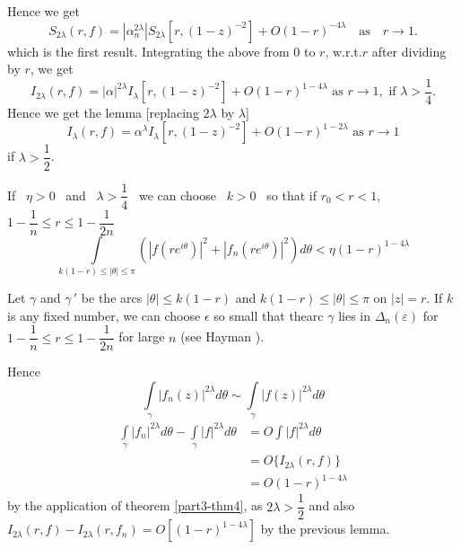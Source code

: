 Hence we get
$$
S_{2\lambda}(r,f)=|\alpha^{2\lambda}_{n}|S_{2\lambda}[r,(1-z)^{-2}] +
O(1-r)^{-4\lambda}\quad\text{as}\quad 
r\to 1.
$$
which is the first result. Integrating the above from $0$ to $r$,
w.r.t.\@ $r$ after dividing by $r$, we get
$$
I_{2\lambda}(r,f)=|\alpha|^{2\lambda}I_{\lambda}[r,(1-z)^{-2}] +
O(1-r)^{1-4\lambda}\text{   \  as \ } r\to 1, \text{ \  if \ }
\lambda>\frac{1}{4}. 
$$
Hence we get the lemma [replacing $2\lambda$ by $\lambda$]
$$
I_{\lambda}(r,f)=\alpha^{\lambda}I_{\lambda}
[r,(1-z)^{-2}] + O(1-r)^{1-2\lambda}\text{ \ as \ } r\to 1 
$$
if $\lambda>\dfrac{1}{2}$.

\begin{lem}\label{part3-lem6}
If \, $\eta>0$ \, and \, $\lambda>\dfrac{1}{4}$ \, we can choose \,
$k>0$ \, so that if \; $r_{0}<r<1$, $1-\dfrac{1}{n}\leq r\leq 1-\dfrac{1}{2n}$ 
$$
\int\limits_{k(1-r)\leq |\theta|\leq
  \pi} \left( |f(re^{i\theta})|^{2}+|f_{n}(re^{i\theta})|^{2} \right)
d\theta<\eta(1-r)^{1-4\lambda}  
$$
\end{lem}

Let $\gamma$ and $\gamma \,'$ be the arcs $|\theta|\leq k(1-r)$ and
$k(1-r)\leq |\theta|\leq \pi$ on $|z|=r$. If $k$ is any fixed number,
we can choose $\epsilon$ so small that the\pageoriginale arc $\gamma$
lies in $\Delta_{n}(\varepsilon)$ for $1-\dfrac{1}{n}\leq r\leq
1-\dfrac{1}{2n}$ for large $n$ (see Hayman \cite{1}).

Hence
$$
\int\limits_{\gamma}|f_{n}(z)|^{2\lambda}d\theta\sim \int\limits_{\gamma}|f(z)|^{2\lambda}d\theta
$$
\begin{align*}
\int\limits_{\gamma}|f_{n}|^{2\lambda}d\theta-\int\limits_{\gamma}|f|^{2\lambda}
d\theta &= O\int|f|^{2\lambda}d\theta\\
&= O\{I_{2\lambda}(r,f)\}\\
&= O(1-r)^{1-4\lambda}
\end{align*}
by the application of theorem \ref{part3-thm4}, as
$2\lambda>\dfrac{1}{2}$ and also
$I_{2\lambda}(r,f)-I_{2\lambda}(r,f_{n})=O[(1-r)^{1-4\lambda}]$ by the
previous lemma.

